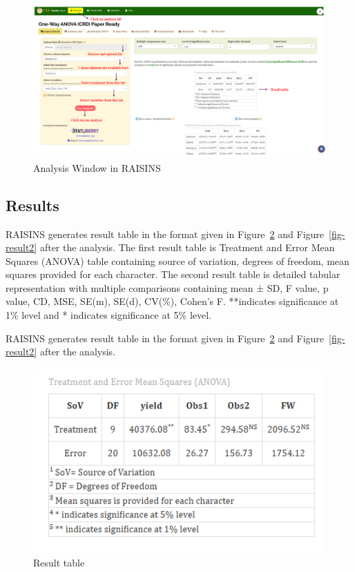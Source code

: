 \documentclass[
  letterpaper,
  DIV=11,
  numbers=noendperiod]{scrartcl}
\begin{document}
\begin{figure}

{\centering \includegraphics{sstabs.webp}

}

\caption{\label{fig-analysistab}Analysis Window in RAISINS}

\end{figure}

\hypertarget{sec-results}{%
\subsection{Results}\label{sec-results}}

RAISINS generates result table in the format given in
Figure~\ref{fig-result} and Figure~\ref{fig-result2} after the analysis.
The first result table is Treatment and Error Mean Squares (ANOVA) table
containing source of variation, degrees of freedom, mean squares
provided for each character. The second result table is detailed tabular
representation with multiple comparisons containing mean ± SD, F value,
p value, CD, MSE, SE(m), SE(d), CV(\%), Cohen's F. **indicates
significance at 1\% level and * indicates significance at 5\% level.

RAISINS generates result table in the format given in
Figure~\ref{fig-result} and Figure~\ref{fig-result2} after the analysis.

\begin{figure}

{\centering \includegraphics{Results table .webp}

}

\caption{\label{fig-result}Result table}

\end{figure}
\end{document}
